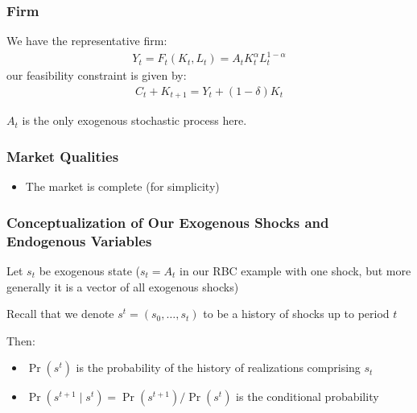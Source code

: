 \documentclass[10pt]{article}
\begin{document}

\subsubsection{Firm}

We have the representative firm:
\begin{align}
    Y_t=F_t\left(K_t, L_t\right)=A_t K_t^\alpha L_t^{1-\alpha}
\end{align}
our feasibility constraint is given by:
\begin{align}
    C_t+K_{t+1}=Y_t+(1-\delta) K_t
\end{align}

$A_t$ is the only exogenous stochastic process here.




\subsubsection{Market Qualities}

\begin{itemize}
    \item The market is complete (for simplicity)
\end{itemize}


\subsubsection{Conceptualization of Our Exogenous Shocks and Endogenous Variables}

Let $s_t$ be exogenous state ($s_t=A_t$ in our RBC example with one shock, but more generally it is a vector of all exogenous shocks)

Recall that we denote $s^t=\left(s_0, \ldots, s_t\right)$ to be a history of shocks up to period $t$

Then:

\begin{itemize}
    \item $\operatorname{Pr}\left(s^t\right)$ is the probability of the history of realizations comprising $s_t$
    \item $\operatorname{Pr}\left(s^{t+1} \mid s^t\right)=\operatorname{Pr}\left(s^{t+1}\right) / \operatorname{Pr}\left(s^t\right)$ is the conditional probability
\end{itemize}
\end{document}
